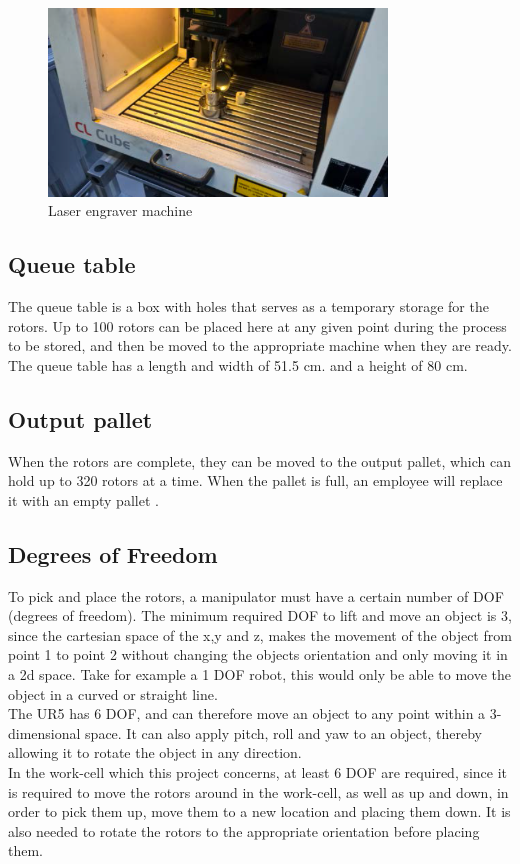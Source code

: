   \begin{figure}[h]
    \centering
    \includegraphics[width=9cm]{InitialProblemstatement/Case/engrave.PNG}
    \caption{Laser engraver machine\cite{Case}}
    \label{fig:Laserengravermachine}
  \end{figure}
  
 \subsection{Queue table}
 The queue table is a box with holes that serves as a temporary storage for the rotors. Up to 100 rotors can be placed here at any given point during the process to be stored, and then be moved to the appropriate machine when they are ready. The queue table has a length and width of 51.5 cm. and a height of 80 cm\cite{Case}.\\  
 
 \subsection{Output pallet}
 When the rotors are complete, they can be moved to the output pallet, which can hold up to 320 rotors at a time. When the pallet is full, an employee will replace it with an empty pallet \cite{Case}.\\ 
 
\subsection{Degrees of Freedom}\label{DOFSec}

To pick and place the rotors, a manipulator must have a certain number of DOF (degrees of freedom). The minimum required DOF to lift and move an object is 3, since the cartesian space of the x,y and z, makes the movement of the object from point 1 to point 2 without changing the objects orientation and only moving it in a 2d space. Take for example a 1 DOF robot, this would only be able to move the object in a curved or straight line.\\
The UR5 has 6 DOF, and can therefore move an object to any point within a 3-dimensional space. It can also apply pitch, roll and yaw to an object, thereby allowing it to rotate the object in any direction\cite{DOF}. \\ 
In the work-cell which this project concerns, at least 6 DOF are required, since it is required to move the rotors around in the work-cell, as well as up and down, in order to pick them up, move them to a new location and placing them down. It is also needed to rotate the rotors to the appropriate orientation before placing them.

